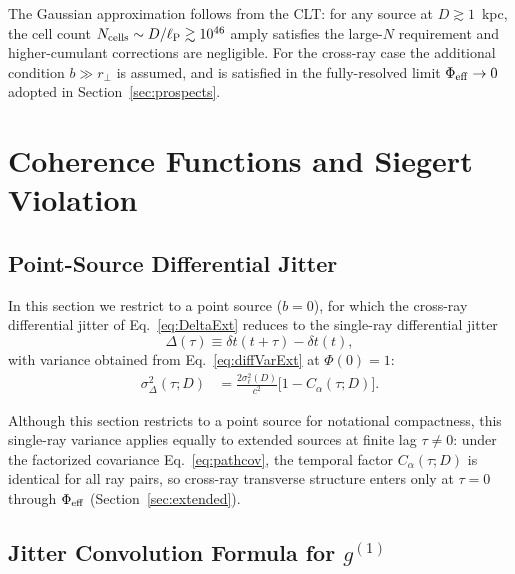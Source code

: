 \documentclass[aps,prd,onecolumn,amsmath,amssymb]{revtex4-2}
\begin{document}
The Gaussian approximation follows from the CLT: for any source at
$D \gtrsim 1$~kpc, the cell count $N_{\rm cells} \sim D/\ell_{\rm P} \gtrsim 10^{46}$
amply satisfies the large-$N$ requirement and higher-cumulant corrections
are negligible.
For the cross-ray case the additional condition $b \gg r_\perp$ is assumed,
and is satisfied in the fully-resolved limit $\Phi_{\rm eff} \to 0$ adopted
in Section~\ref{sec:prospects}.

\section{Coherence Functions and Siegert Violation}
\label{sec:g1}

\subsection{Point-Source Differential Jitter}
\label{sec:pointsource_jitter}

In this section we restrict to a point source ($b=0$),
for which the cross-ray differential jitter of Eq.~\eqref{eq:DeltaExt}
reduces to the single-ray differential jitter
\begin{equation}
  \Delta(\tau) \equiv \delta t(t+\tau) - \delta t(t),
  \label{eq:DeltaDef}
\end{equation}
with variance obtained from Eq.~\eqref{eq:diffVarExt} at $\Phi(0)=1$:
\begin{align}
  \sigma_\Delta^2(\tau;D)
  &= \frac{2\sigma_\ell^2(D)}{c^2}\big[1 - C_\alpha(\tau;D)\big].
  \label{eq:diffVar}
\end{align}

Although this section restricts to a point source for notational compactness, this single-ray variance applies equally to extended sources at finite lag $\tau \neq 0$: under the factorized covariance Eq.~\eqref{eq:pathcov}, the temporal factor $C_\alpha(\tau;D)$ is identical for all ray pairs, so cross-ray transverse structure enters only at $\tau=0$ through $\Phi_{\rm eff}$ (Section~\ref{sec:extended}).

\subsection{Jitter Convolution Formula for $g^{(1)}$}
\end{document}
